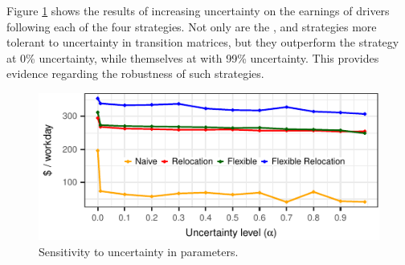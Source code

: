 Figure \ref{fig:uncertainty_evolution} shows the results of increasing uncertainty on the earnings of drivers following each of the four strategies. Not only are the {\relocation}, {\flexible} and {\relocationflexible} strategies more tolerant to uncertainty in transition matrices, but they outperform the {\naive} strategy at 0\% uncertainty, while themselves at with 99\% uncertainty. This provides evidence regarding the robustness of such strategies.

\begin{figure}[H]
	\centering
	\includegraphics{figures/uncertainty_evolution.pdf}
	\caption{Sensitivity to uncertainty in parameters.}
	\label{fig:uncertainty_evolution}
\end{figure}




